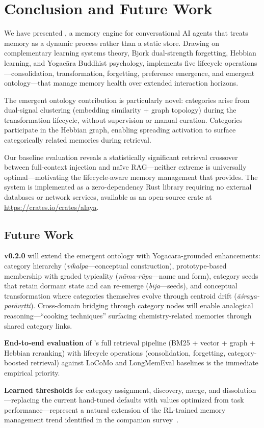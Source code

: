 \section{Conclusion and Future Work}
\label{sec:conclusion}

We have presented \alaya{}, a memory engine for conversational AI agents
that treats memory as a dynamic process rather than a static store. Drawing
on complementary learning systems theory, Bjork dual-strength forgetting,
Hebbian learning, and Yogac\=ara Buddhist psychology, \alaya{} implements
five lifecycle operations---consolidation, transformation, forgetting,
preference emergence, and emergent ontology---that manage memory health
over extended interaction horizons.

The emergent ontology contribution is particularly novel: categories arise
from dual-signal clustering (embedding similarity + graph topology) during
the transformation lifecycle, without supervision or manual curation.
Categories participate in the Hebbian graph, enabling spreading activation
to surface categorically related memories during retrieval.

Our baseline evaluation reveals a statistically significant retrieval
crossover between full-context injection and na\"ive RAG---neither extreme
is universally optimal---motivating the lifecycle-aware memory management
that \alaya{} provides. The system is implemented as a zero-dependency Rust
library requiring no external databases or network services, available as
an open-source crate at \url{https://crates.io/crates/alaya}.

\subsection*{Future Work}

\textbf{v0.2.0} will extend the emergent ontology with Yogac\=ara-grounded
enhancements: category hierarchy (\emph{vikalpa}---conceptual
construction), prototype-based membership with graded typicality
(\emph{n\=ama-r\=upa}---name and form), category seeds that retain dormant
state and can re-emerge (\emph{b\=ija}---seeds), and conceptual
transformation where categories themselves evolve through centroid drift
(\emph{\=a\'sraya-par\=av\d{r}tti}). Cross-domain bridging through
category nodes will enable analogical reasoning---``cooking techniques''
surfacing chemistry-related memories through shared category links.

\textbf{End-to-end evaluation} of \alaya{}'s full retrieval pipeline
(BM25 + vector + graph + Hebbian reranking) with lifecycle operations
(consolidation, forgetting, category-boosted retrieval) against LoCoMo
and LongMemEval baselines is the immediate empirical priority.

\textbf{Learned thresholds} for category assignment, discovery, merge, and
dissolution---replacing the current hand-tuned defaults with values
optimized from task performance---represent a natural extension of the
RL-trained memory management trend identified in the companion
survey~\cite{hui2026taxonomy}.
